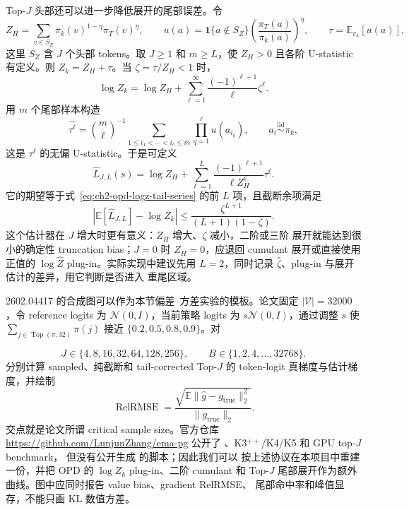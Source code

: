 Top-$J$ 头部还可以进一步降低展开的尾部误差。令
\begin{equation}
Z_H=\sum_{v\in S_Z}\pi_k(v)^{1-\eta}\pi_T(v)^\eta,
\qquad
u(a)=\mathbf 1\{a\notin S_Z\}
 \left(\frac{\pi_T(a)}{\pi_k(a)}\right)^\eta,
\qquad \tau=\mathbb E_{\pi_k}[u(a)],
\end{equation}
这里 $S_Z$ 含 $J$ 个头部 tokens。取 $J\ge1$ 和 $m\ge L$，使 $Z_H>0$ 且各阶 U-statistic 有定义。则 $Z_k=Z_H+\tau$。当 $\zeta=\tau/Z_H<1$ 时，
\begin{equation}
\log Z_k=\log Z_H+
\sum_{\ell=1}^{\infty}\frac{(-1)^{\ell+1}}{\ell}\zeta^\ell.
\label{eq:ch2-opd-logz-tail-series}
\end{equation}
用 $m$ 个尾部样本构造
\begin{equation}
\widehat{\tau^\ell}=\binom{m}{\ell}^{-1}
\sum_{1\le i_1<\cdots<i_\ell\le m}
\prod_{q=1}^{\ell}u(a_{i_q}),
\qquad a_i\overset{\mathrm{iid}}{\sim}\pi_k,
\end{equation}
这是 $\tau^\ell$ 的无偏 U-statistic。于是可定义
\begin{equation}
\widehat L_{J,L}(s)=\log Z_H+
\sum_{\ell=1}^{L}\frac{(-1)^{\ell+1}}{\ell Z_H^\ell}
\widehat{\tau^\ell}.
\label{eq:ch2-opd-logz-tail-series-estimator}
\end{equation}
它的期望等于式~\eqref{eq:ch2-opd-logz-tail-series} 的前 $L$ 项，且截断余项满足
\begin{equation}
\left|\mathbb E[\widehat L_{J,L}]-\log Z_k\right|
\leq \frac{\zeta^{L+1}}{(L+1)(1-\zeta)}.
\label{eq:ch2-opd-logz-tail-remainder}
\end{equation}
这个估计器在 $J$ 增大时更有意义：$Z_H$ 增大、$\zeta$ 减小，二阶或三阶
展开就能达到很小的确定性 truncation bias；$J=0$ 时 $Z_H=0$，应退回
cumulant 展开或直接使用正值的 $\log\widehat Z$ plug-in。实际实现中建议先用
$L=2$，同时记录 $\widehat\zeta$、plug-in 与展开估计的差异，用它判断是否进入
重尾区域。

2602.04417 的合成图可以作为本节偏差--方差实验的模板。论文固定
$|\mathcal V|=32000$，令 reference logits 为 $\mathcal N(0,I)$，当前策略
logits 为 $s\mathcal N(0,I)$，通过调整 $s$ 使
$\sum_{j\in\operatorname{Top}(\pi,32)}\pi(j)$ 接近
$\{0.2,0.5,0.8,0.9\}$。对

\[J\in\{4,8,16,32,64,128,256\},\qquad B\in\{1,2,4,\ldots,32768\}.\]
分别计算 sampled、纯截断和 tail-corrected
Top-$J$ 的 token-logit 真梯度与估计梯度，并绘制
\begin{equation}
\operatorname{RelRMSE}
 =\frac{\sqrt{\mathbb E\lVert\widehat g-g_{\mathrm{true}}\rVert_2^2}}
 {\lVert g_{\mathrm{true}}\rVert_2}.
\end{equation}
交点就是论文所谓 critical sample size。官方仓库
\url{https://github.com/LunjunZhang/ema-pg} 公开了
、K3$^{++}$/K4/K5 和 GPU top-$J$ benchmark，
但没有公开生成  的脚本；因此我们可以
按上述协议在本项目中重建一份，并把 OPD 的 $\log Z_k$ plug-in、二阶 cumulant
和 Top-$J$ 尾部展开作为额外曲线。图中应同时报告 value bias、gradient RelRMSE、
尾部命中率和峰值显存，不能只画 KL 数值方差。

